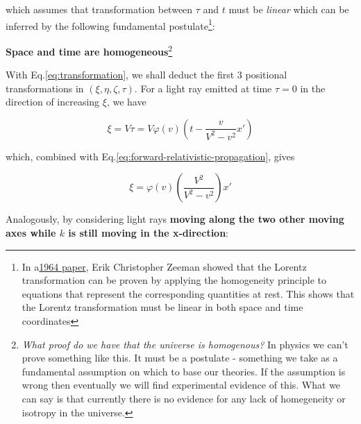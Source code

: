 \begin{tcolorbox}
    which assumes that transformation between $\tau$ and $t$ must be \textit{linear} which can be inferred by the
    following fundamental postulate\footnote{In a\href{https://download.wpsoftware.net/causality-lorentz-group-zeeman.pdf}{1964 paper}, Erik Christopher Zeeman showed that the Lorentz transformation can be proven by applying the homogeneity principle to equations that represent the corresponding quantities at rest. This shows that the Lorentz transformation must be linear in both space and time coordinates}:

    \begin{tcolorbox}[
        enhanced,frame hidden,boxrule=0pt,interior style={top color=green!10!white,
        bottom color=green!10!white,middle color=green!50!yellow},
        fuzzy halo=1pt with green
    ]
        \begin{center}
            \textbf{Space and time are homogeneous}\footnote{\textit{What proof do we have that the universe is
            homogenous?} In physics we can't prove something like this. It must be a postulate - something we take as a
            fundamental assumption on which to base our theories. If the assumption is wrong then eventually we will find
            experimental evidence of this. What we can say is that currently there is no evidence for any lack of
            homegeneity or isotropy in the universe.}
        \end{center}
    \end{tcolorbox}

    With Eq.\ref{eq:transformation}, we shall deduct the first 3 positional transformations in $(\xi, \eta, \zeta, \tau)$.
    For a light ray emitted at time $\tau = 0$ in the direction of increasing $\xi$, we have

    \begin{equation}
        \xi = V\tau = V\varphi(v)\left( t - \frac{v}{V^2 - v^2} x' \right)
    \end{equation}

    which, combined with Eq.\ref{eq:forward-relativistic-propagation}, gives

    \begin{equation}\label{eq:x-transformation}
    \xi = \varphi(v)\left( \frac{V^2}{V^2 - v^2} \right) x'
    \end{equation}

    Analogously, by considering light rays \textbf{moving along the two other moving axes while $k$ is still moving in the
    x-direction}:


\end{tcolorbox}
